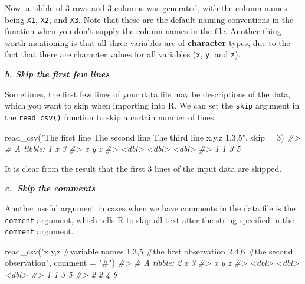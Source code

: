 \documentclass[
]{book}
\newenvironment{Shaded}{\begin{snugshade}}{\end{snugshade}}
\newcommand{\AttributeTok}[1]{\textcolor[rgb]{0.77,0.63,0.00}{#1}}
\newcommand{\CommentTok}[1]{\textcolor[rgb]{0.56,0.35,0.01}{\textit{#1}}}
\newcommand{\DecValTok}[1]{\textcolor[rgb]{0.00,0.00,0.81}{#1}}
\newcommand{\FunctionTok}[1]{\textcolor[rgb]{0.00,0.00,0.00}{#1}}
\newcommand{\NormalTok}[1]{#1}
\newcommand{\StringTok}[1]{\textcolor[rgb]{0.31,0.60,0.02}{#1}}
\begin{document}
Now, a tibble of 3 rows and 3 columns was generated, with the column names being \texttt{X1}, \texttt{X2}, and \texttt{X3}. Note that these are the default naming conventions in the function when you don't supply the column names in the file. Another thing worth mentioning is that all three variables are of \textbf{character} types, due to the fact that there are character values for all variables (\texttt{x}, \texttt{y}, and \texttt{z}).

\textbf{\emph{b. Skip the first few lines}}

Sometimes, the first few lines of your data file may be descriptions of the data, which you want to skip when importing into R. We can set the \texttt{skip} argument in the \texttt{read\_csv()} function to skip a certain number of lines.

\begin{Shaded}
\begin{Highlighting}[]
\FunctionTok{read\_csv}\NormalTok{(}\StringTok{"The first line }
\StringTok{          The second line}
\StringTok{          The third line}
\StringTok{          x,y,z}
\StringTok{          1,3,5"}\NormalTok{, }\AttributeTok{skip =} \DecValTok{3}\NormalTok{)}
\CommentTok{\#\textgreater{} \# A tibble: 1 x 3}
\CommentTok{\#\textgreater{}       x     y     z}
\CommentTok{\#\textgreater{}   \textless{}dbl\textgreater{} \textless{}dbl\textgreater{} \textless{}dbl\textgreater{}}
\CommentTok{\#\textgreater{} 1     1     3     5}
\end{Highlighting}
\end{Shaded}

It is clear from the result that the first 3 lines of the input data are skipped.

\textbf{\emph{c.~Skip the comments}}

Another useful argument in cases when we have comments in the data file is the \texttt{comment} argument, which tells R to skip all text after the string specified in the \texttt{comment} argument.

\begin{Shaded}
\begin{Highlighting}[]
\FunctionTok{read\_csv}\NormalTok{(}\StringTok{"x,y,z \#variable names}
\StringTok{         1,3,5 \#the first observation}
\StringTok{         2,4,6 \#the second observation"}\NormalTok{, }\AttributeTok{comment =} \StringTok{"\#"}\NormalTok{)}
\CommentTok{\#\textgreater{} \# A tibble: 2 x 3}
\CommentTok{\#\textgreater{}       x     y     z}
\CommentTok{\#\textgreater{}   \textless{}dbl\textgreater{} \textless{}dbl\textgreater{} \textless{}dbl\textgreater{}}
\CommentTok{\#\textgreater{} 1     1     3     5}
\CommentTok{\#\textgreater{} 2     2     4     6}
\end{Highlighting}
\end{Shaded}
\end{document}
